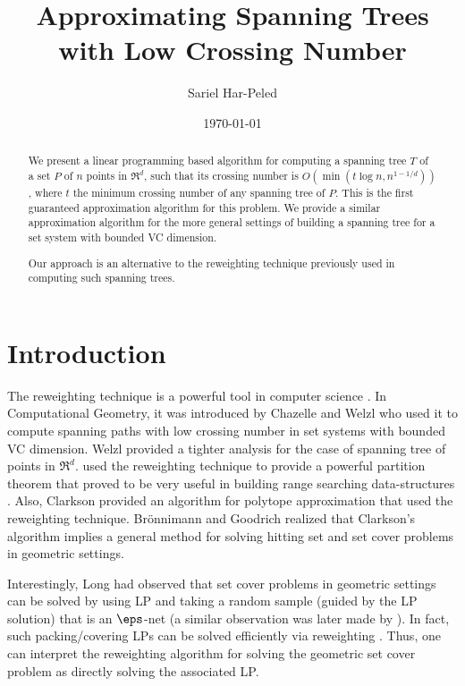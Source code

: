 \documentclass[12pt]{article}
\newcommand{\PntSet}{P}
\newcommand{\Term}[1]{\textsf{#1}}
\newcommand{\LP}{\Term{L{}P}\xspace}
\newcommand{\VC}{\Term{V{C}}\xspace}
\providecommand{\Bronnimann}{Br{\"o}nnimann\xspace}
\begin{document}
\title{Approximating Spanning Trees with Low Crossing Number}

\author{Sariel Har-Peled\SarielThanks{}}

\date{\today}

\maketitle

\begin{abstract}
    We present a linear programming based algorithm for computing a
    spanning tree $T$ of a set $\PntSet$ of $n$ points in $\Re^d$,
    such that its crossing number is $O(\min( t \log n, n^{1-1/d}) )$,
    where $t$ the minimum crossing number of any spanning tree of
    $\PntSet$. This is the first guaranteed approximation algorithm
    for this problem.  We provide a similar approximation algorithm
    for the more general settings of building a spanning tree for a
    set system with bounded \VC dimension.

    Our approach is an alternative to the reweighting technique
    previously used in computing such spanning trees.
\end{abstract}




\section{Introduction}

The reweighting technique is a powerful tool in computer science
\cite{ahk-mwmma-06}. In Computational Geometry, it was introduced by
Chazelle and Welzl \cite{cw-qorss-89} who used it to compute spanning
paths with low crossing number in set systems with bounded \VC
dimension. Welzl \cite{w-stlcn-92} provided a tighter analysis for the
case of spanning tree of points in $\Re^d$.  \Matousek \cite{m-ept-92}
used the reweighting technique to provide a powerful partition theorem
that proved to be very useful in building range searching
data-structures \cite{ae-rsir-98}.  Also, Clarkson \cite{c-apca-93}
provided an algorithm for polytope approximation that used the
reweighting technique.  \Bronnimann and Goodrich \cite{bg-aoscf-95}
realized that Clarkson's algorithm implies a general method for
solving hitting set and set cover problems in geometric settings.


Interestingly, Long \cite{l-upsda-01} had observed that set cover
problems in geometric settings can be solved by using \LP and taking a
random sample (guided by the \LP solution) that is an $\eps$-net (a
similar observation was later made by \cite{ers-hsvcs-05}). In fact,
such packing/covering \LP{}s can be solved efficiently via reweighting
\cite{pst-faafp-91}. Thus, one can interpret the reweighting algorithm
for solving the geometric set cover problem as directly solving the
associated \LP.
\end{document}
